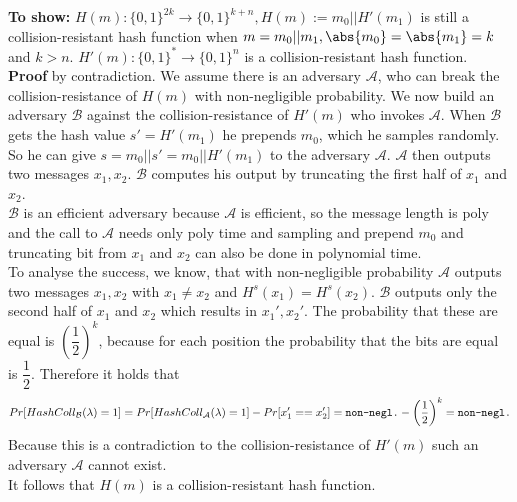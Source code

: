 \textbf{To show: } \(H(m) : \{0,1\}^{2k} \rightarrow \{0,1\}^{k+n}, H(m) := m_0 \vert \vert H'(m_1)\) is still a collision-resistant hash function when \(m = m_0 \vert \vert m_1, \abs{m_0} = \abs{m_1} = k\) and \(k > n\). \(H'(m) : \{0,1\}^{*} \rightarrow \{0,1\}^{n}\) is a collision-resistant hash function.\\
\textbf{Proof} by contradiction. We assume there is an adversary \(\mathcal{A}\), who can break the collision-resistance of \(H(m)\) with non-negligible probability. We now build an adversary \(\mathcal{B}\) against the collision-resistance of \(H'(m)\) who invokes \(\mathcal{A}\). When  \(\mathcal{B}\) gets the hash value \(s' = H'(m_1)\) he prepends \(m_0\), which he samples randomly. So he can give \(s= m_0 \vert \vert s' = m_0 \vert \vert H'(m_1)\) to the adversary \(\mathcal{A}\). \(\mathcal{A}\) then outputs two messages \(x_1, x_2\). \(\mathcal{B}\) computes his output by truncating the first half of \(x_1\) and \(x_2\). \\
\(\mathcal{B}\) is an efficient adversary because \(\mathcal{A}\) is efficient, so the message length is poly and the call to \(\mathcal{A}\) needs only poly time and sampling and prepend \(m_0\) and truncating bit from \(x_1\) and \(x_2\) can also be done in polynomial time. \\
To analyse the success, we know, that with non-negligible probability \(\mathcal{A}\) outputs two messages \(x_1, x_2\) with \(x_1 \neq x_2\) and \(H^s(x_1) = H^s(x_2)\). \(\mathcal{B}\) outputs only the second half of \(x_1\) and \(x_2\) which results in \(x_1', x_2'\). The probability that these are equal is \(\left(\dfrac{1}{2}\right)^{k}\), because for each position the probability that the bits are equal is \(\dfrac{1}{2}\). Therefore it holds that
\begin{equation*}
	Pr[HashColl_{\mathcal{B}}(\lambda) = 1] = Pr[HashColl_{\mathcal{A}}(\lambda) = 1] - 	Pr[x_1' == x_2'] = \verb|non-negl.| - \left(\dfrac{1}{2}\right)^{k}  = \verb|non-negl.|
\end{equation*}
Because this is a contradiction to the collision-resistance of \(H'(m)\) such an adversary \(\mathcal{A}\) cannot exist.\\
It follows that \(H(m)\) is a collision-resistant hash function.

